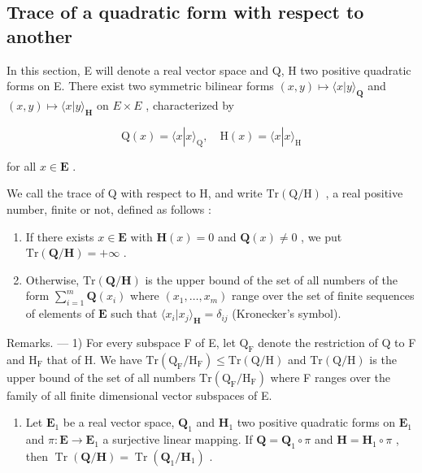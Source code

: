 \subsection{Trace of a quadratic form with respect to another}

In this section, E will denote a real vector space and Q, H two positive quadratic forms on E. There exist two symmetric bilinear forms \((x, y) \mapsto \langle x | y \rangle_{\mathbf{Q}}\) and \((x, y) \mapsto \langle x | y \rangle_{\mathbf{H}}\) on \(E \times E\) , characterized by

\[
\mathrm{Q} (x) = \langle x | x \rangle_ {\mathrm{Q}}, \quad \mathrm{H} (x) = \langle x | x \rangle_ {\mathrm{H}}
\]

for all \(x \in \mathbf{E}\) .

We call the trace of Q with respect to H, and write \(\mathrm{Tr}(\mathrm{Q}/\mathrm{H})\) , a real positive number, finite or not, defined as follows :

\begin{enumerate}
\def\labelenumi{\alph{enumi})}
\tightlist
\item
  If there exists \(x \in \mathbf{E}\) with \(\mathbf{H}(x) = 0\) and \(\mathbf{Q}(x) \neq 0\) , we put \(\mathrm{Tr}(\mathbf{Q} / \mathbf{H}) = +\infty\) .
\item
  Otherwise, \(\mathrm{Tr}(\mathbf{Q} / \mathbf{H})\) is the upper bound of the set of all numbers of the form \(\sum_{i=1}^{m} \mathbf{Q}(x_i)\) where \((x_1, \ldots, x_m)\) range over the set of finite sequences of elements of \(\mathbf{E}\) such that \(\langle x_i | x_j \rangle_{\mathbf{H}} = \delta_{ij}\) (Kronecker's symbol).
\end{enumerate}

Remarks. --- 1) For every subspace F of E, let \(\mathrm{Q}_{\mathrm{F}}\) denote the restriction of Q to F and \(\mathrm{H}_{\mathrm{F}}\) that of H. We have \(\mathrm{Tr}(\mathrm{Q}_{\mathrm{F}} / \mathrm{H}_{\mathrm{F}}) \leqslant \mathrm{Tr}(\mathrm{Q} / \mathrm{H})\) and \(\mathrm{Tr}(\mathrm{Q} / \mathrm{H})\) is the upper bound of the set of all numbers \(\mathrm{Tr}(\mathrm{Q}_{\mathrm{F}} / \mathrm{H}_{\mathrm{F}})\) where F ranges over the family of all finite dimensional vector subspaces of E.

\begin{enumerate}
\def\labelenumi{\arabic{enumi})}
\setcounter{enumi}{1}
\tightlist
\item
  Let \(\mathbf{E}_1\) be a real vector space, \(\mathbf{Q}_1\) and \(\mathbf{H}_1\) two positive quadratic forms on \(\mathbf{E}_1\) and \(\pi: \mathbf{E} \to \mathbf{E}_1\) a surjective linear mapping. If \(\mathbf{Q} = \mathbf{Q}_1 \circ \pi\) and \(\mathbf{H} = \mathbf{H}_1 \circ \pi\) , then \(\operatorname{Tr}(\mathbf{Q}/\mathbf{H}) = \operatorname{Tr}(\mathbf{Q}_1/\mathbf{H}_1)\) .
\end{enumerate}

